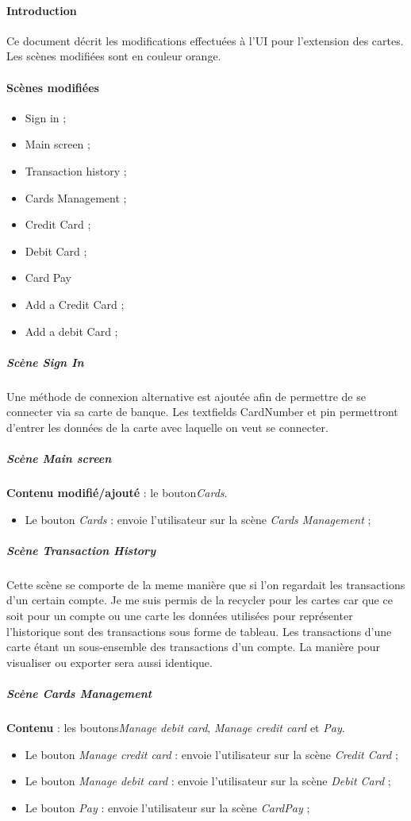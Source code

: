 \documentclass{article}
\newcommand{\navbutton}[2]{Le bouton \emph{#1} : envoie l'utilisateur sur la scène \emph{#2}}
\newcommand{\modif}[1]{\textbf{Contenu modifié/ajouté} : #1}
\newcommand{\content}[1]{\textbf{Contenu} : #1}
\begin{document}
\paragraph{Introduction}
\noindent
Ce document décrit les modifications effectuées à l'UI pour l'extension des cartes.
Les scènes modifiées sont en couleur orange. \\

\paragraph{Scènes modifiées}
\begin{itemize}
\item Sign in ;
\item Main screen ;
\item Transaction history ;
\item Cards Management ;
\item Credit Card ;
\item Debit Card ;
\item Card Pay
\item Add a Credit Card ;
\item Add a debit Card ;
\end{itemize}

\subparagraph{Scène \emph{Sign In}}
Une méthode de connexion alternative est ajoutée afin de permettre de se connecter
via sa carte de banque. Les textfields CardNumber et pin permettront d'entrer les
données de la carte avec laquelle on veut se connecter.



\subparagraph{Scène \emph{Main screen}}
\modif{le bouton\emph{Cards}.}
\begin{itemize}
\item \navbutton{Cards}{Cards Management} ;
\end{itemize}


\subparagraph{Scène \emph{Transaction History}}
Cette scène se comporte de la meme manière que si l'on regardait les transactions
d'un certain compte. Je me suis permis de la recycler pour les cartes car que ce
soit pour un compte ou une carte les données utilisées pour représenter l'historique
sont des transactions sous forme de tableau. Les transactions d'une carte étant un
sous-ensemble des transactions d'un compte. La manière pour visualiser ou exporter
sera aussi identique.  


\subparagraph{Scène \emph{Cards Management}}
\content{les boutons\emph{Manage debit card}, \emph{Manage credit card} et \emph{Pay}.}
\begin{itemize}
\item \navbutton{Manage credit card}{Credit Card} ;
\item \navbutton{Manage debit card}{Debit Card} ;
\item \navbutton{Pay}{CardPay} ;
\end{itemize}
\end{document}
